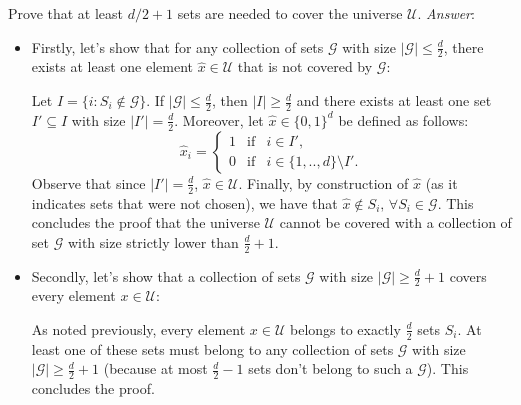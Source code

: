 \documentclass[10pt]{article}
\newenvironment{exercise}[2][Exercise]{\begin{trivlist}
  \item[\hskip \labelsep {\bfseries #1}\hskip \labelsep {\bfseries #2.}]}{\end{trivlist}}
\begin{document}
  \begin{exercise}{4b}
  Prove that at least $d/2 + 1$ sets are needed to cover the universe $\mathcal{U}$. \newline
  \emph{Answer}: 
  \begin{itemize}
  \item Firstly, let's show that for any collection of sets $\mathcal{G}$ with size $|\mathcal{G}| \leq \frac{d}{2} $, there exists at least one element $\hat{x} \in \mathcal{U}$ that is not covered by $\mathcal{G}$:
  \newline 
  
  Let $I = \{ i : S_i \notin \mathcal{G}\}$. If $|\mathcal{G}| \leq \frac{d}{2}$, then $|I| \geq \frac{d}{2}$ and there exists at least one set $I' \subseteq I$ with size $|I'| = \frac{d}{2}$. Moreover, let $\hat{x} \in \{0,1\}^d$ be defined as follows:
  \begin{displaymath}
  \hat{x}_i = \left\{ \begin{array}{rcl}1 & \mbox{if} & i \in I', \\ 0 & \mbox{if} & i \in \{1,..,d\}\setminus I'. \end{array}\right.
  \end{displaymath}
  Observe that since $|I'|=\frac{d}{2}$, $\hat{x} \in \mathcal{U}$. Finally, by construction of $\hat{x}$ (as it indicates sets that were not chosen), we have that $\hat{x} \notin S_i, \, \forall S_i \in \mathcal{G}$. This concludes the proof that the universe $\mathcal{U}$ cannot be covered with a collection of set $\mathcal{G}$ with size strictly lower than $\frac{d}{2} + 1$. 
  
 \item Secondly, let's show that a collection of sets $\mathcal{G}$ with size $|\mathcal{G}| \geq \frac{d}{2} + 1$ covers every element $x \in \mathcal{U}$:
 \newline 
 
 As noted previously, every element $x \in \mathcal{U}$ belongs to exactly $\frac{d}{2}$ sets $S_i$. At least one of these sets must belong to any collection of sets $\mathcal{G}$ with size $|\mathcal{G}| \geq \frac{d}{2} + 1$ (because at most $\frac{d}{2}-1$ sets don't belong to such a $\mathcal{G}$). This concludes the proof.
 \end{itemize}
  \end{exercise}
  
\end{document}
